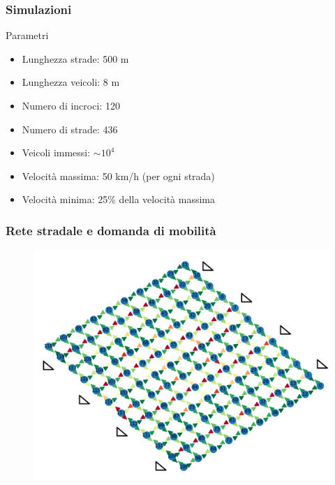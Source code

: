 \documentclass[
	11pt, %
]{beamer}
\begin{document}
\begin{frame}
	\frametitle{Simulazioni} %
	
		\begin{block}{Parametri}
			\begin{itemize}
				\item Lunghezza strade: 500 m
				\item Lunghezza veicoli: 8 m
				\item Numero di incroci: 120
				\item Numero di strade: 436
				\item Veicoli immessi: $\sim 10^4$
				\item Velocit\`a massima: 50 km/h (per ogni strada)
				\item Velocit\`a minima: 25\% della velocit\`a massima
			\end{itemize}
			
		\end{block}	
\end{frame}

\begin{frame}
	\frametitle{Rete stradale e domanda di mobilit\`a} %
	\centering
	\begin{figure}
		\includegraphics[width=.8\textwidth]{example.png}
	\end{figure}
\end{frame}
\end{document}
